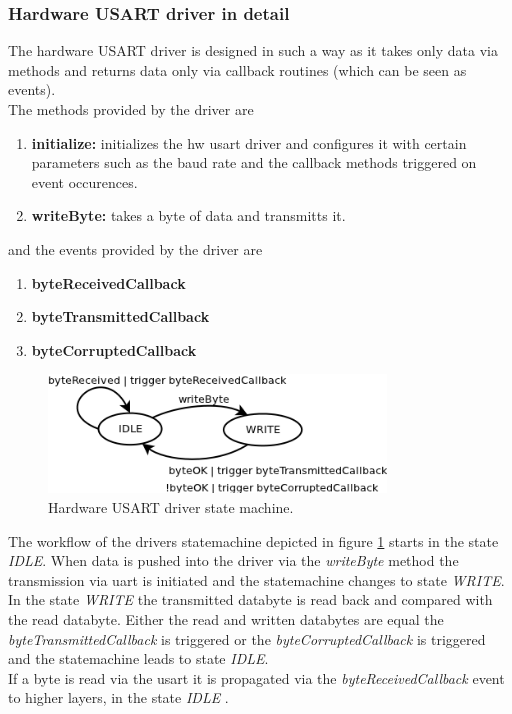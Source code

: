 \subsubsection{Hardware USART driver in detail}
\label{sec:bus:design:layer1:interface:hwuart}

The hardware USART driver is designed in such a way as it takes only data via methods and returns data only via callback routines (which can be seen as events).\\

The methods provided by the driver are

\begin{enumerate}
 \item \textbf{initialize: } initializes the hw usart driver and configures it with certain parameters such as the baud rate and the callback methods triggered on event occurences.
 \item \textbf{writeByte: } takes a byte of data and transmitts it.
\end{enumerate}

and the events provided by the driver are

\begin{enumerate}
 \item \textbf{byteReceivedCallback}
 \item \textbf{byteTransmittedCallback}
 \item \textbf{byteCorruptedCallback}
\end{enumerate}

\begin{figure}[h]
\centering
\includegraphics[width=0.8\textwidth]{../images/hwuart_statemachine.png}
\caption{Hardware USART driver state machine.}
\label{fig:bus:design:layer1:interface:hwuart}
\end{figure}

The workflow of the drivers statemachine depicted in figure \ref{fig:bus:design:layer1:interface:hwuart} starts in the state \textit{IDLE}.
When data is pushed into the driver via the \textit{writeByte} method the transmission via uart is initiated and the statemachine changes to state \textit{WRITE}.\\

In the state \textit{WRITE} the transmitted databyte is read back and compared with the read databyte. 
Either the read and written databytes are equal the \textit{byteTransmittedCallback} is triggered or the \textit{byteCorruptedCallback} is triggered and the statemachine leads to state \textit{IDLE}.\\

If a byte is read via the usart it is propagated via the \textit{byteReceivedCallback} event to higher layers, in the state \textit{IDLE} .\\
